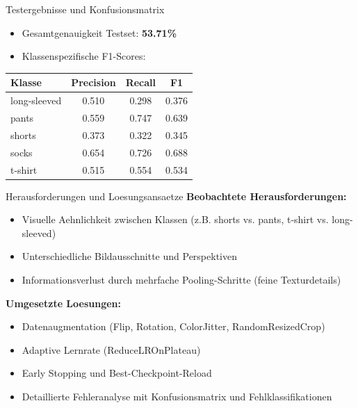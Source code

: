 \documentclass{beamer}
\begin{document}
\begin{frame}{Testergebnisse und Konfusionsmatrix}
\small
\begin{itemize}
    \item Gesamtgenauigkeit Testset: \textbf{53.71\%}
    \item Klassenspezifische F1-Scores:
\end{itemize}

\begin{table}[h]
\centering
\begin{tabular}{l c c c}
\toprule
\textbf{Klasse} & \textbf{Precision} & \textbf{Recall} & \textbf{F1} \\
\midrule
long-sleeved & 0.510 & 0.298 & 0.376 \\
pants & 0.559 & 0.747 & 0.639 \\
shorts & 0.373 & 0.322 & 0.345 \\
socks & 0.654 & 0.726 & 0.688 \\
t-shirt & 0.515 & 0.554 & 0.534 \\
\bottomrule
\end{tabular}
\end{table}

\end{frame}

\begin{frame}{Herausforderungen und Loesungsansaetze}
\textbf{Beobachtete Herausforderungen:}
\begin{itemize}
    \item Visuelle Aehnlichkeit zwischen Klassen (z.B. shorts vs. pants, t-shirt vs. long-sleeved)
    \item Unterschiedliche Bildausschnitte und Perspektiven
    \item Informationsverlust durch mehrfache Pooling-Schritte (feine Texturdetails)
\end{itemize}

\textbf{Umgesetzte Loesungen:}
\begin{itemize}
    \item Datenaugmentation (Flip, Rotation, ColorJitter, RandomResizedCrop)
    \item Adaptive Lernrate (ReduceLROnPlateau)
    \item Early Stopping und Best-Checkpoint-Reload
    \item Detaillierte Fehleranalyse mit Konfusionsmatrix und Fehlklassifikationen
\end{itemize}

\end{frame}
\end{document}
